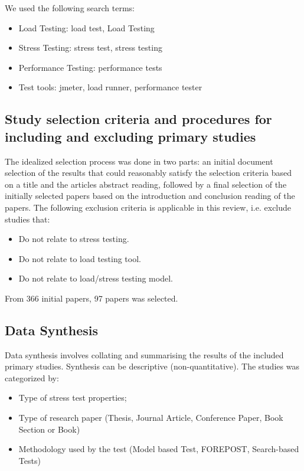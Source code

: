 \documentclass{report}
\begin{document}
We used the following search terms:

\begin{itemize}
\item Load Testing: load test, Load Testing
\item Stress Testing: stress test, stress testing
\item Performance Testing: performance tests
\item Test tools: jmeter, load runner, performance tester
\end{itemize}


\subsection{Study selection criteria and procedures for including and excluding
primary studies}

The idealized selection process was done in two parts: an initial document selection of the results that could reasonably satisfy the selection criteria based on a title and the articles abstract reading, followed by a final selection of the initially selected papers based on the introduction and conclusion reading of the papers. The following exclusion criteria is applicable in this review, i.e. exclude studies that:
\begin{itemize}
\item Do not relate to stress testing.
\item Do not relate to load testing tool.
\item Do not relate to load/stress testing model.
\end{itemize}

From 366 initial papers, 97 papers was selected.

\subsection{Data Synthesis}

Data synthesis involves collating and summarising the results of the included primary studies. Synthesis can be descriptive (non-quantitative).  The studies was categorized by:

\begin{itemize}
\item Type of stress test properties;
\item Type of research paper (Thesis, Journal Article, Conference Paper, Book Section or Book)
\item Methodology used by the test (Model based Test, FOREPOST, Search-based Tests)
\end{itemize}
\end{document}
